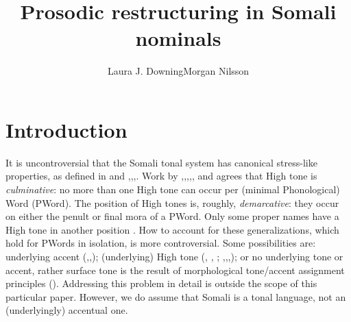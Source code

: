 \documentclass[output=paper]{langscibook}
\author{Laura J. Downing\lastand Morgan Nilsson\affiliation{University of Gothenburg, Sweden}}
\title{Prosodic restructuring in Somali nominals}
\begin{document}
 
\maketitle


\section{Introduction}
\label{sec:downing:1}
It is uncontroversial that the Somali tonal system has canonical stress-like properties, as defined in \cite{Downing2010} and \citet{Hyman2006},\citet{Hyman2011},\citet{Hyman2012},\citet{Hyman2014}. Work by \citet{Hyman1981},\cite{Hyman2006},\cite{Hyman2012},\cite{LeGac2003},\cite{Green2016}, and \citet{Saeed2004} agrees that High tone is \textit{culminative}: no more than one High tone can occur per (minimal Phonological) Word (PWord). The position of High tones is, roughly, \textit{demarcative}: they occur on either the penult or final mora of a PWord. Only some proper names have a High tone in another position \citep[22]{Saeed1999}. How to account for these generalizations, which hold for PWords in isolation, is more controversial. Some possibilities are: underlying accent (\citealt{Banti1988},\citealt{Green2016},\citealt{LeGac2003}); (underlying) High tone (\citealt{Andrzejewski1964}, \citeyear{Andrzejewski1979}, \citeyear{Andrzejewski1981}; \citealt{Armstrong1934},\citealt{Hyman2006},\citealt{Hyman2014},\citealt{LeGac2016}); or no underlying tone or accent, rather surface tone is the result of morphological tone/accent assignment principles (\citealt{Hyman1981,Mous2009}). Addressing this problem in detail is outside the scope of this particular paper. However, we do assume that Somali is a tonal language, not an (underlyingly) accentual one.
\end{document}
